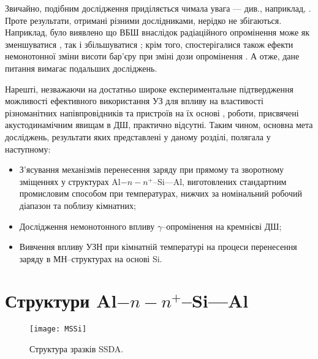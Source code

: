 
Звичайно, подібним дослідження приділяється чимала увага  --- див., наприклад,
\cite{Kumar1, Rao, Kumar2, Sharma, Ohyama, Tataroglu,Tascioglu2010old,Tataroglu:2007NIMA,Tataroglu3,Karatas:2006NIMA,Umana,Kinoshita,Vorobets,Pattabi,Kovalyuk,Verma,Abdolahpour}.
Проте результати, отримані різними дослідниками, нерідко не збігаються.
Наприклад, було виявлено що ВБШ внаслідок радіаційного опромінення може як зменшуватися \cite{Kumar1, Rao, Kumar2, Sharma, Ohyama,Tataroglu3},
так і збільшуватися \cite{Tataroglu,Tascioglu2010old,Tataroglu:2007NIMA};
крім того, спостерігалися також ефекти немонотонної зміни висоти бар'єру при зміні дози опромінення \cite{Karatas:2006NIMA,Umana,Kinoshita,Vorobets, Pattabi, Kovalyuk,Verma}.
А отже, дане питання вимагає подальших досліджень.

Нарешті, незважаючи на достатньо широке експериментальне підтвердження можливості ефективного використання УЗ для впливу на властивості різноманітних напівпровідників та
пристроїв на їх основі
\cite{Bahar2003,ZobovFTP2008,Parchinskii2006r,Roman:2007APL,Roman:2010JAP,Zaver2005,Davletova2008,Teterkin2009r,Tagaev,Pashaev2012r,YOlikhTPL2011r,Zaveryukhin2002:2},
роботи, присвячені акустодинамічним явищам в ДШ, практично відсутні.
Таким чином, основна мета досліджень, результати яких представлені у даному розділі, полягала у наступному:
\begin{itemize}[leftmargin=0cm,itemindent=1em]
  \item З'ясування механізмів перенесення заряду  при прямому та
    зворотному зміщеннях у структурах Al$-n-n^+$--Si---Al, виготовлених стандартним промисловим способом при температурах, нижчих за номінальний робочий діапазон та поблизу кімнатних;
  \item Дослідження немонотонного впливу $\gamma$--опромінення на кремнієві ДШ;
  \item Вивчення впливу УЗН при кімнатній температурі на процеси перенесення заряду в МН--структурах на основі Si.
\end{itemize}



\section{Структури Al$-n-n^+$--Si---Al\label{MSSi}}

\begin{figure}[b]
\center
\texttt{[image: MSSi]}%
\caption{\label{figMSSi}
Структура зразків SSDA.
}
\end{figure}

